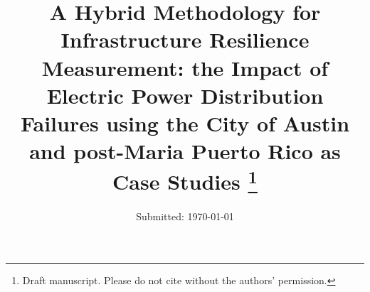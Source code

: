 
  \title{\vspace{-15mm}\fontsize{21pt}{10pt}\selectfont\textbf{A
      Hybrid Methodology for Infrastructure Resilience Measurement:
      the Impact of Electric Power Distribution Failures using the
      City of Austin and post-Maria Puerto Rico as Case Studies
      \thanks{Draft manuscript. Please do not cite without the
        authors' permission.}}}  

	\date{Submitted: \usvardate\today}

\makeatletter
\renewcommand{\@maketitle}{
\newpage
 \null
 \vskip 2em%
 \begin{center}%
  {\LARGE \@title \par}%
 \end{center}%
 \par} \makeatother
